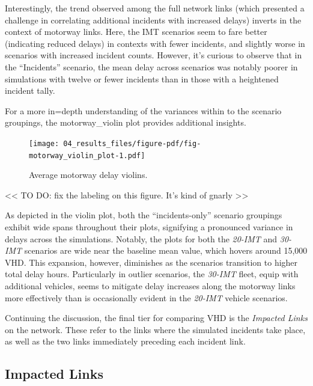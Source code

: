 \documentclass[fancy, oneside, mastersfancy, ms]{byuthesis}
\begin{document}
Interestingly, the trend observed among the full network links (which
presented a challenge in correlating additional incidents with increased
delays) inverts in the context of motorway links. Here, the IMT
scenarios seem to fare better (indicating reduced delays) in contexts
with fewer incidents, and slightly worse in scenarios with increased
incident counts. However, it's curious to observe that in the
``Incidents'' scenario, the mean delay across scenarios was notably
poorer in simulations with twelve or fewer incidents than in those with
a heightened incident tally.

For a more in=depth understanding of the variances within to the
scenario groupings, the motorway\_violin plot provides additional
insights.

\begin{figure}

{\centering \texttt{[image: 04\_results\_files/figure-pdf/fig-motorway\_violin\_plot-1.pdf]}

}

\caption{\label{fig-motorway_violin_plot}Average motorway delay
violins.}

\end{figure}

\textless\textless{} TO DO: fix the labeling on this figure. It's kind
of gnarly \textgreater\textgreater{}

As depicted in the violin plot, both the ``incidents-only'' scenario
groupings exhibit wide spans throughout their plots, signifying a
pronounced variance in delays across the simulations. Notably, the plots
for both the \emph{20-IMT} and \emph{30-IMT} scenarios are wide near the
baseline mean value, which hovers around 15,000 VHD. This expansion,
however, diminishes as the scenarios transition to higher total delay
hours. Particularly in outlier scenarios, the \emph{30-IMT} fleet, equip
with additional vehicles, seems to mitigate delay increases along the
motorway links more effectively than is occasionally evident in the
\emph{20-IMT} vehicle scenarios.

Continuing the discussion, the final tier for comparing VHD is the
\emph{Impacted Links} on the network. These refer to the links where the
simulated incidents take place, as well as the two links immediately
preceding each incident link.

\hypertarget{impacted-links}{%
\subsection{Impacted Links}\label{impacted-links}}
\end{document}
